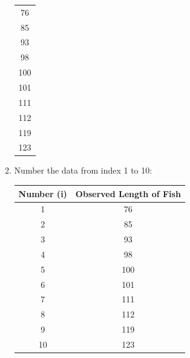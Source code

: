 \documentclass[12pt]{article}
\begin{document}
\begin{itemize}
\begin{enumerate}
\begin{center}
\begin{tabular}{c}
				            \hline
				            76                      \\
				            85                      \\
				            93                      \\
				            98                      \\
				            100                     \\
				            101                     \\
				            111                     \\
				            112                     \\
				            119                     \\
				            123
			            \end{tabular}
		            \end{center}
		      \item Number the data from index 1 to 10:
		            \begin{center}
			            \begin{tabular}{c | c}
				            Number (i) & Observed Length of Fish \\
				            \hline
				            1          & 76                      \\
				            2          & 85                      \\
				            3          & 93                      \\
				            4          & 98                      \\
				            5          & 100                     \\
				            6          & 101                     \\
				            7          & 111                     \\
				            8          & 112                     \\
				            9          & 119                     \\
				            10         & 123
			            \end{tabular}
		            \end{center}


\end{enumerate}
\end{itemize}
\end{document}
